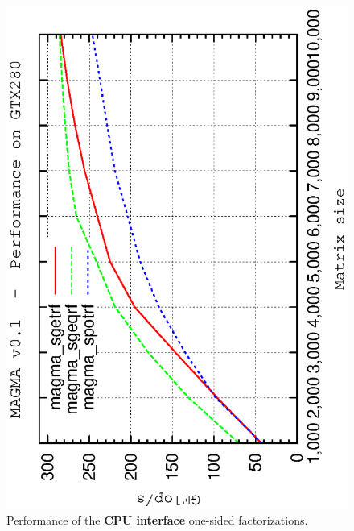 \documentclass[10pt]{book}
\begin{document}
       \begin{figure}[!ht]
          \centering
          \hspace{-5mm}
          \includegraphics[angle=-90,scale=0.7]{sp-cpu.ps}
          \caption{Performance of the {\bf CPU interface} 
                   one-sided factorizations.}
       \label{sp-cpu-performance}
       \end{figure}
\end{document}
